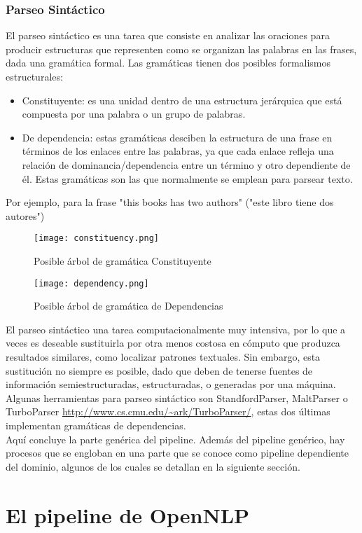 \subsubsection{Parseo Sintáctico}
El parseo sintáctico es una tarea que consiste en analizar las oraciones para producir estructuras que representen como se organizan las palabras en las frases, dada una gramática formal. Las gramáticas tienen dos posibles formalismos estructurales: 
\begin{itemize}
\item Constituyente: es una unidad dentro de una estructura jerárquica que está compuesta por una palabra o un grupo de palabras. \newline
\item De dependencia: estas gramáticas desciben la estructura de una frase en términos de los enlaces entre las palabras, ya que cada enlace refleja una relación de dominancia/dependencia entre un término y otro dependiente de él. Estas gramáticas son las que normalmente se emplean para parsear texto. 
\end{itemize}
Por ejemplo, para la frase \textsf{"this books has two authors" ("este libro tiene dos autores")} \newline
\begin{figure}[H]%
\centering
\texttt{[image: constituency.png]}  %
\label{}
\caption{Posible árbol de gramática Constituyente}   
\end{figure}
\begin{figure}[H]%
\centering
\texttt{[image: dependency.png]}  %
\label{}
\caption{Posible árbol de gramática de Dependencias}   
\end{figure}

 El parseo sintáctico una tarea computacionalmente muy intensiva, por lo que a veces es deseable sustituirla por otra menos costosa en cómputo que produzca resultados similares, como \textsf{localizar patrones textuales}. Sin embargo, esta sustitución no siempre es posible, dado que deben de tenerse fuentes de información semiestructuradas, estructuradas, o generadas por una máquina. \newline
 Algunas herramientas para parseo sintáctico son \textsf{StandfordParser}, \textsf{MaltParser} \citet{nivre2006maltparser} o \textsf{TurboParser} \url{http://www.cs.cmu.edu/~ark/TurboParser/}, estas dos últimas implementan gramáticas de dependencias.
\\[\baselineskip]
Aquí concluye la parte genérica del pipeline. Además del pipeline genérico, hay procesos que se engloban en una parte que se conoce como pipeline dependiente del dominio, algunos de los cuales se detallan en la siguiente sección.

\section{El pipeline de OpenNLP}


 
  



 